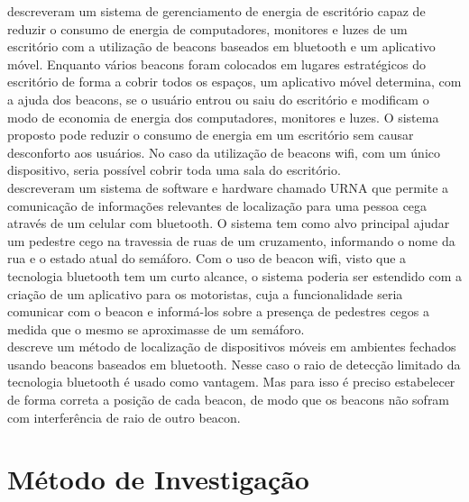\cite{ChoiParkLee} descreveram um sistema de gerenciamento de energia de escritório capaz de reduzir o consumo de energia de computadores, monitores e luzes de um escritório com a utilização de beacons baseados em bluetooth e um aplicativo móvel. Enquanto vários beacons foram colocados em lugares estratégicos do escritório de forma a cobrir todos os espaços, um aplicativo móvel determina, com a ajuda dos beacons, se o usuário entrou ou saiu do escritório e modificam o modo de economia de energia dos computadores, monitores e luzes. O sistema proposto pode reduzir o consumo de energia em um escritório sem causar desconforto aos usuários. No caso da utilização de beacons wifi, com um único dispositivo, seria possível cobrir toda uma sala do escritório. \\
\indent \cite{Bohonos} descreveram um sistema de software e hardware chamado URNA que permite a comunicação de informações relevantes de localização para uma pessoa cega através de um celular com bluetooth. O sistema tem como alvo principal ajudar um pedestre cego na travessia de ruas de um cruzamento, informando o nome da rua e o estado atual do semáforo. Com o uso de beacon wifi, visto que a tecnologia bluetooth tem um curto alcance, o sistema poderia ser estendido com a criação de um aplicativo para os motoristas, cuja a funcionalidade seria comunicar com o beacon e informá-los sobre a presença de pedestres cegos a medida que o mesmo se aproximasse de um semáforo. \\
\indent \cite{Chawathe} descreve um método de localização de dispositivos móveis em ambientes fechados usando beacons baseados em bluetooth. Nesse caso o raio de detecção limitado da tecnologia bluetooth é usado como vantagem. Mas para isso é preciso estabelecer de forma correta a posição de cada beacon, de modo que os beacons não sofram com interferência de raio de outro beacon.

\section{Método de Investigação}
\label{sec:metodo-investigacao}

